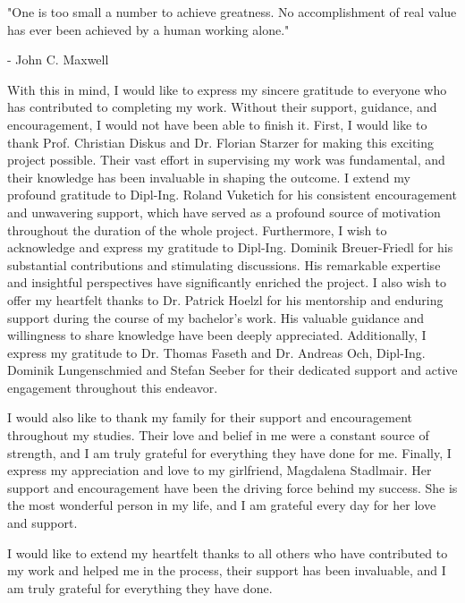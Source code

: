 
\cleardoubleoddpage%
\begin{acks*}

"One is too small a number to achieve greatness. No accomplishment of real value has ever been achieved by a human working alone."

\hfill - John C. Maxwell


With this in mind, I would like to express my sincere gratitude to everyone who has contributed to completing my work. 
Without their support, guidance, and encouragement, I would not have been able to finish it.
First, I would like to thank Prof. Christian Diskus and Dr. Florian Starzer for making this exciting project possible. 
Their vast effort in supervising my work was fundamental, and their knowledge has been invaluable in shaping the outcome.
I extend my profound gratitude to Dipl-Ing. Roland Vuketich for his consistent encouragement and unwavering support, 
which have served as a profound source of motivation throughout the duration of the whole project.
Furthermore, I wish to acknowledge and express my gratitude to Dipl-Ing. Dominik Breuer-Friedl for his substantial contributions and stimulating discussions. 
His remarkable expertise and insightful perspectives have significantly enriched the project.
I also wish to offer my heartfelt thanks to Dr. Patrick Hoelzl for his mentorship and enduring support during the course of my bachelor's work. 
His valuable guidance and willingness to share knowledge have been deeply appreciated.
Additionally, I express my gratitude to Dr. Thomas Faseth and Dr. Andreas Och, Dipl-Ing. Dominik Lungenschmied and Stefan Seeber for their dedicated support and active engagement throughout this endeavor.

I would also like to thank my family for their support and encouragement throughout my studies. 
Their love and belief in me were a constant source of strength, and I am truly grateful for everything they have done for me.
Finally, I express my appreciation and love to my girlfriend, Magdalena Stadlmair. 
Her support and encouragement have been the driving force behind my success. 
She is the most wonderful person in my life, and I am grateful every day for her love and support.

I would like to extend my heartfelt thanks to all others who have contributed to my work and helped me in the process, 
their support has been invaluable, and I am truly grateful for everything they have done. 
\end{acks*}
%


